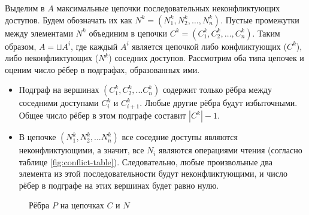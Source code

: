 Выделим в $A$ максимальные цепочки последовательных неконфликтующих доступов. Будем обозначать их как $N^k = (N^k_1, N^k_2, \ldots, N^k_n)$. Пустые промежутки между элементами $N^k$ объединим в цепочки $C^k = (C^k_1, C^k_2, \ldots, C^k_n)$. Таким образом, $A = \sqcup A^i$, где каждый $A^i$ является цепочкой либо конфликтующих ($C^k$), либо неконфликтующих ($N^k$) соседних доступов. Рассмотрим оба типа цепочек и оценим число рёбер в подграфах, образованных ими.

\begin{itemize}
    \item Подграф на вершинах $(C^k_1, C^k_2, ... C^k_n)$ содержит только рёбра между соседними доступами $C^k_i$ и $C^k_{i+1}$. Любые другие рёбра будут избыточными. Общее число рёбер в этом подграфе составит $|C^k| - 1$.
    \item В цепочке $(N^k_1, N^k_2, ... N^k_n)$ все соседние доступы являются неконфликтующими, а значит, все $N_i$ являются операциями чтения (согласно таблице \ref{fig:conflict-table}). Следовательно, любые произвольные два элемента из этой последовательности будут неконфликтующими, и число рёбер в подграфе на этих вершинах будет равно нулю.
\end{itemize}

\begin{figure}[H]
    \centering
    \caption{Рёбра $P$ на цепочках $C$ и $N$}
\end{figure}

